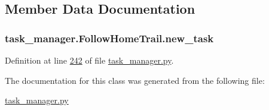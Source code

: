 \subsection{Member Data Documentation}
\hypertarget{classtask__manager_1_1FollowHomeTrail_aae7878e14c1b1aeeac617e2e03074705}{
\subsubsection[{new\+\_\+task}]{\setlength{\rightskip}{0pt plus 5cm}task\+\_\+manager.\+Follow\+Home\+Trail.\+new\+\_\+task}}\label{classtask__manager_1_1FollowHomeTrail_aae7878e14c1b1aeeac617e2e03074705}


Definition at line \hyperlink{task__manager_8py_source_l00242}{242} of file \hyperlink{task__manager_8py_source}{task\+\_\+manager.\+py}.



The documentation for this class was generated from the following file\+:\begin{DoxyCompactItemize}
\item 
\hyperlink{task__manager_8py}{task\+\_\+manager.\+py}\end{DoxyCompactItemize}
